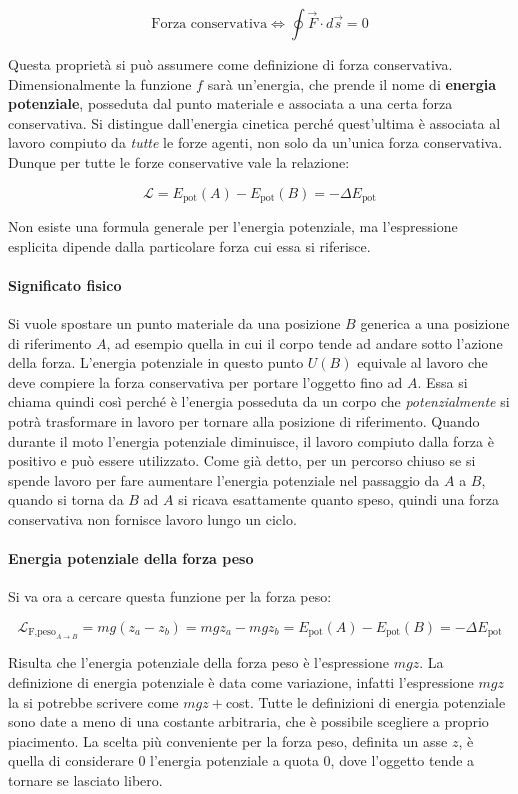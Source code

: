\[
	\boxed{\text{Forza conservativa} \iff \oint \vec{F} \cdot d\vec{s} = 0}
\]

Questa proprietà si può assumere come definizione di forza conservativa.
Dimensionalmente la funzione $f$ sarà un'energia, che prende il nome di 	\textbf{energia potenziale}, posseduta dal punto materiale e associata a una certa forza conservativa. Si distingue dall'energia cinetica perché quest'ultima è associata al lavoro compiuto da \emph{tutte} le forze agenti, non solo da un'unica forza conservativa. Dunque per tutte le forze conservative vale la relazione:

\[
	\mathcal{L}=E_{\text{pot}}(A)-E_{\text{pot}}(B)=-\Delta E_{\text{pot}}
\]

Non esiste una formula generale per l'energia potenziale, ma l'espressione esplicita dipende dalla particolare forza cui essa si riferisce.

\paragraph{Significato fisico} Si vuole spostare un punto materiale da una posizione $B$ generica a una posizione di riferimento $A$, ad esempio quella in cui il corpo tende ad andare sotto l'azione della forza. L'energia potenziale in questo punto $U(B)$ equivale al lavoro che deve compiere la forza conservativa per portare l'oggetto fino ad $A$. Essa si chiama quindi così perché è l'energia posseduta da un corpo che \emph{potenzialmente} si potrà trasformare in lavoro per tornare alla posizione di riferimento. Quando durante il moto l'energia potenziale diminuisce, il lavoro compiuto dalla forza è positivo e può essere utilizzato. Come già detto, per un percorso chiuso se si spende lavoro per fare aumentare l'energia potenziale nel passaggio da $A$ a $B$, quando si torna da $B$ ad $A$ si ricava esattamente quanto speso, quindi una forza conservativa non fornisce lavoro lungo un ciclo.

\paragraph{Energia potenziale della forza peso} Si va ora a cercare questa funzione per la forza peso:

\[
	\mathcal{L}_{\text{F,peso}_{A\to B}}=mg(z_a-z_b)=mgz_a-mgz_b=E_{\text{pot}}(A)-E_{ \text{pot} } (B)=-\Delta E_{ \text{pot} }
\]

Risulta che l'energia potenziale della forza peso è l'espressione $mgz$. La definizione di energia potenziale è data come variazione, infatti l'espressione $mgz$ la si potrebbe scrivere come $mgz+$cost. Tutte le definizioni di energia potenziale sono date a meno di una costante arbitraria, che è possibile scegliere a proprio piacimento. La scelta più conveniente per la forza peso, definita un asse $z$, è quella di considerare $0$ l'energia potenziale a quota $0$, dove l'oggetto tende a tornare se lasciato libero.


